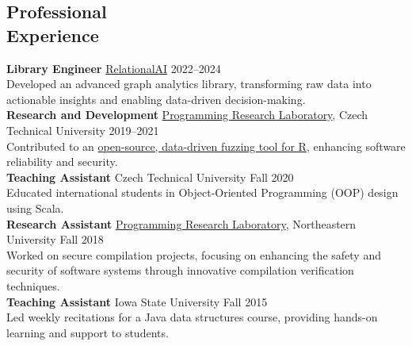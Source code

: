 \documentclass[margin,line]{resume}
\newcommand\mymedskip{10pt}
\begin{document}
\begin{resume}
    \section{\mysidestyle Professional\\Experience}
    \textbf{Library Engineer} \hfill {\href{https://relational.ai/}{RelationalAI}} 2022--2024\\
    {\small Developed an advanced graph analytics library, transforming raw data into actionable insights and enabling data-driven decision-making.}\\[\mymedskip]
    \textbf{Research and Development} \hfill {\href{https://prl-prg.github.io/}{Programming Research Laboratory}}, Czech Technical University 2019--2021\\
    {\small Contributed to an \href{https://github.com/PRL-PRG/signatr}{open-source, data-driven fuzzing tool for R}, enhancing software reliability and security.}\\[\mymedskip]
    \textbf{Teaching Assistant} \hfill {Czech Technical University} Fall 2020\\
    {\small Educated international students in Object-Oriented Programming (OOP) design using Scala.}\\[\mymedskip]
    \textbf{Research Assistant} \hfill {\href{https://prl.ccs.neu.edu/}{Programming Research Laboratory}, Northeastern University} Fall 2018\\
    {\small Worked on secure compilation projects, focusing on enhancing the safety and security of software systems through innovative compilation verification techniques.}\\[\mymedskip]
    \textbf{Teaching Assistant} \hfill {Iowa State University} Fall 2015\\
    {\small Led weekly recitations for a Java data structures course, providing hands-on learning and support to students.}
    


\end{resume}
\end{document}
